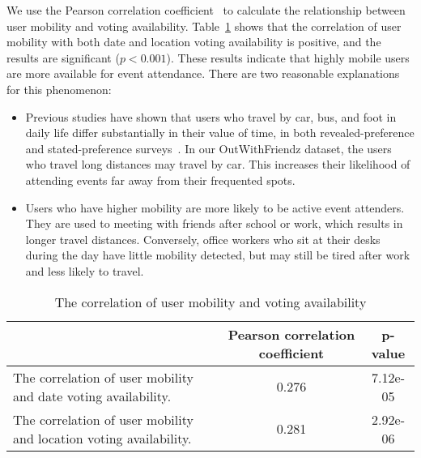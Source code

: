 We use the Pearson correlation coefficient~\cite{lawrence1989concordance} to
calculate the relationship between user mobility and voting availability.
Table~\ref{tab:mobility} shows that the correlation of user mobility with both
date and location voting availability is positive, and the results are
significant ($p<0.001$).
These results indicate that highly mobile users are more available for event
attendance.  There are two reasonable explanations for this phenomenon:
\begin{itemize}
\item Previous studies have shown that users who travel by car, bus, and foot
in daily life differ substantially in their value of time, in both revealed-preference and stated-preference 
surveys~\cite{liu1997assessment, elgar2004car}. In our OutWithFriendz dataset, the users who 
travel long distances may travel by car. This increases their likelihood of
attending events far away from their frequented spots. 
\item Users who have higher mobility are more likely to be active event
attenders. They are used to meeting with friends after school or work, which
results in longer travel distances. Conversely, office workers who sit
at their desks during the day have little mobility detected, but may still be
tired after work and less likely to travel.
\end{itemize}

\begin{table}[]
\centering
\caption{The correlation of user mobility and voting availability}
\label{tab:mobility}
\begin{tabular}{|l|c|c|}
\hline
                                                         & Pearson correlation coefficient & p-value  \\ \hline
The correlation of user mobility and date voting availability. & 0.276                             & 7.12e-05 \\ \hline
The correlation of user mobility and location voting availability. & 0.281                             & 2.92e-06 \\ \hline
\end{tabular}
\end{table}

